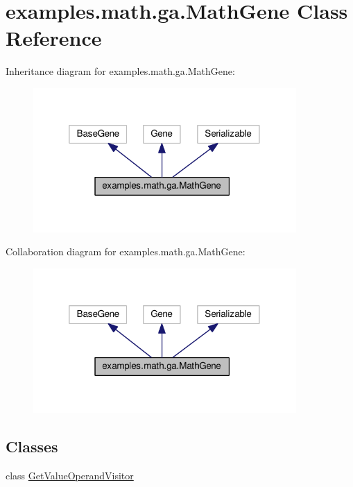 \hypertarget{classexamples_1_1math_1_1ga_1_1_math_gene}{\section{examples.\-math.\-ga.\-Math\-Gene Class Reference}
\label{classexamples_1_1math_1_1ga_1_1_math_gene}
}


Inheritance diagram for examples.\-math.\-ga.\-Math\-Gene\-:
\nopagebreak
\begin{figure}[H]
\begin{center}
\leavevmode
\includegraphics[width=284pt]{classexamples_1_1math_1_1ga_1_1_math_gene__inherit__graph}
\end{center}
\end{figure}


Collaboration diagram for examples.\-math.\-ga.\-Math\-Gene\-:
\nopagebreak
\begin{figure}[H]
\begin{center}
\leavevmode
\includegraphics[width=284pt]{classexamples_1_1math_1_1ga_1_1_math_gene__coll__graph}
\end{center}
\end{figure}
\subsection*{Classes}
\begin{DoxyCompactItemize}
\item 
class \hyperlink{classexamples_1_1math_1_1ga_1_1_math_gene_1_1_get_value_operand_visitor}{Get\-Value\-Operand\-Visitor}
\end{DoxyCompactItemize}
